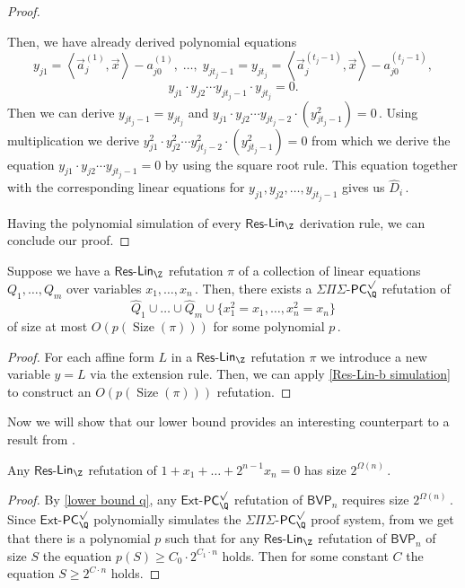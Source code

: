 \documentclass{toc}
\DeclareMathOperator{\Size}{\mathrm{Size}}   %
\begin{document}
\begin{proof}
\begin{itemize}
    Then, we have already derived polynomial equations 
    $$
    y_{j 1} = \left\langle \vec a_j^{(1)}, \vec x \right \rangle - a_{j 0}^{(1)}, \; \ldots, \; y_{j t_{j} - 1} = y_{j t_j} = \left\langle \vec a_j^{(t_{j} - 1)}, \vec x \right \rangle - a_{j 0}^{(t_j - 1)},
    $$
    $$
    y_{j 1} \cdot y_{j 2} \cdots y_{j t_j - 1} \cdot y_{j t_j} = 0.
    $$
    Then we can derive $y_{j t_j - 1} = y_{j t_j}$ and %
$y_{j 1} \cdot y_{j 2} \cdots y_{j t_j - 2} \cdot (y_{j t_j - 1}^2) = 0\,.$ %
 Using multiplication we derive  $y_{j 1}^2 \cdot y_{j 2}^2 \cdots y_{j t_j - 2}^2 \cdot (y_{j t_j - 1}^2) = 0$ from which we derive the equation $y_{j 1} \cdot y_{j 2} \cdots y_{j t_j - 1} = 0$ by using the square root rule. This equation together with the corresponding linear equations for  $y_{j 1}, y_{j 2}, \ldots, y_{j t_j - 1}$ gives us %
$\widehat{D}_i\,.$ %
\end{itemize}
Having the polynomial simulation of every $\mathsf{Res}$-$\mathsf{Lin}_\Z$ derivation rule, we can conclude our proof.\end{proof}


\begin{corollary}\label{cor:SPS-PC sim of res-lin}
Suppose we have a  $\mathsf{Res}$-$\mathsf{Lin}_\Z$ refutation $\pi$ of a collection of linear equations $Q_1, \ldots, Q_m$ over variables %
$x_1, \ldots, x_n\,.$ %
  Then, there exists a $\Sigma \Pi \Sigma$-$\mathsf{PC}_\Q^{\surd}$ refutation of
$$
\widehat{Q}_1 \cup \ldots \cup \widehat{Q}_m  \cup \{x_1^2 = x_1, \ldots, x_n^2 = x_n\}
$$ 
of size at most $O(p(\Size(\pi)))$ for some polynomial %
$p\,.$ %
\end{corollary}
\begin{proof}
%
For each affine form $L$ in a $\mathsf{Res}$-$\mathsf{Lin}_\Z$ refutation $\pi$ we introduce a new variable $y = L$ via the extension rule. Then, we can apply  \autoref{Res-Lin-b simulation} to construct an $O(p(\Size(\pi)))$ refutation. %
\end{proof}

Now we will show that our lower bound provides an interesting counterpart to a result from  \cite{PT18_new}.

\begin{theorem}\label{Res-Lin lower bound}
%
Any $\mathsf{Res}$-$\mathsf{Lin}_\Z$ refutation of $1 + x_1 + \ldots + 2^{n - 1} x_n = 0$ has size %
$2^{\Omega(n)}\,.$ %
%
\end{theorem}

\begin{proof}
%
By \autoref{lower bound q}, any $\mathsf{Ext}$-$\mathsf{PC}_{\Q}^{\surd}$ refutation of $\mathsf{BVP}_n$  requires size %
$2^{\Omega(n)}\,.$ %
 Since $\mathsf{Ext}$-$\mathsf{PC}_{\Q}^{\surd}$ polynomially simulates the $\Sigma \Pi \Sigma$-$\mathsf{PC}_\Q^{\surd}$ proof system, from  we get that there is a polynomial $p$ such that for any  $\mathsf{Res}$-$\mathsf{Lin}_\Z$ refutation of $\mathsf{BVP}_n$ of size $S$ the equation $p(S) \ge C_0 \cdot 2^{C_1 \cdot n}$ holds. Then for some constant $C$ the equation $S \ge 2^{C \cdot n}$ holds. \end{proof} %
\end{document}
